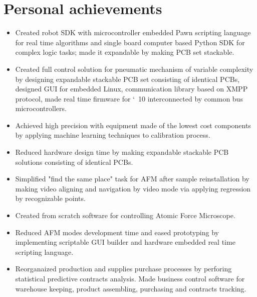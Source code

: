 \section{Personal achievements}
\begin{itemize}

\item Created robot SDK with microcontroller embedded Pawn scripting language for real time algorithms and single board computer based Python SDK for complex logic tasks; made it expandable by making PCB set stackable.

\item Created full control solution for pneumatic mechanism of variable complexity by designing expandable stackable PCB set consisting of identical PCBs, designed GUI for embedded Linux, communication library based on XMPP protocol, made real time firmware for \char`~10 interconnected by common bus microcontrollers.

\item Achieved high precision with equipment made of the lowest cost components by applying machine learning techniques to calibration process.

\item Reduced hardware design time by making expandable stackable PCB solutions consisting of identical PCBs.

\item Simplified "find the same place" task for AFM after sample reinstallation by making video aligning and navigation by video mode via applying regression by recognizable points.

\item Created from scratch software for controlling Atomic Force Microscope.

\item Reduced AFM modes development time and eased prototyping by implementing scriptable GUI builder and hardware embedded real time scripting language.

\item Reorganaized production and supplies purchase processes by perforing statistical predictive contracts analysis. Made business control software for warehouse keeping, product assembling, purchasing and contracts tracking.

\end{itemize}

\vspace*{-4mm}
